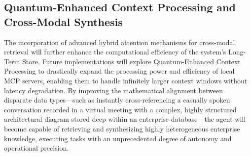 \documentclass[12pt, a4paper]{report}
\begin{document}
\subsection{Quantum-Enhanced Context Processing and Cross-Modal Synthesis}
The incorporation of advanced hybrid attention mechanisms for cross-modal retrieval will further enhance the computational efficiency of the system's Long-Term Store.\cite{hojo2025} Future implementations will explore Quantum-Enhanced Context Processing to drastically expand the processing power and efficiency of local MCP servers, enabling them to handle infinitely larger context windows without latency degradation.\cite{superagi2026} By improving the mathematical alignment between disparate data types—such as instantly cross-referencing a casually spoken conversation recorded in a virtual meeting with a complex, highly structured architectural diagram stored deep within an enterprise database—the agent will become capable of retrieving and synthesizing highly heterogeneous enterprise knowledge, executing tasks with an unprecedented degree of autonomy and operational precision.
\end{document}
